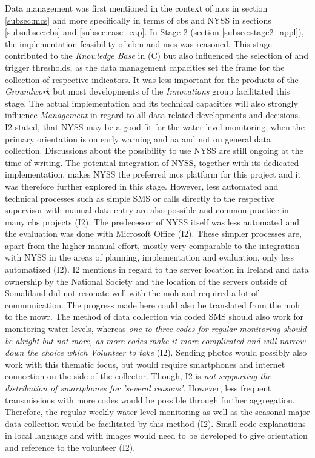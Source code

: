 Data management was first mentioned in the context of \acrlong{mcs} in section \ref*{subsec:mcs} and more specifically in terms of \acrlong{cbs} and NYSS in sections \ref*{subsubsec:cbs} and \ref*{subsec:case_eap}. In Stage 2 (section \ref*{subsec:stage2_appl}), the implementation feasibility of \acrshort{cbm} and \acrshort{mcs} was reasoned.\newline
This stage contributed to the \textit{Knowledge Base} in (C) but also influenced the selection of  and trigger thresholds, as the data management capacities set the frame for the collection of respective indicators. It was less important for the products of the \textit{Groundwork} but most developments of the \textit{Innovations} group facilitated this stage. The actual implementation and its technical capacities will also strongly influence \textit{Management} in regard to all data related developments and decisions.\newline
I2 stated, that NYSS may be a good fit for the water level monitoring, when the primary orientation is on early warning and \acrlong{aa} and not on general data collection. Discussions about the possibility to use NYSS are still ongoing at the time of writing. The potential integration of NYSS, together with its dedicated implementation, makes NYSS the preferred \acrshort{mcs} platform for this project and it was therefore further explored in this stage. However, less automated and technical processes such as simple SMS or calls directly to the respective supervisor with manual data entry are also possible and common practice in many \acrshort{cbs} projects (I2). The predecessor of NYSS itself was less automated and the evaluation was done with Microsoft Office (I2). These simpler processes are, apart from the higher manual effort, mostly very comparable to the integration with NYSS in the areas of planning, implementation and evaluation, only less automatized (I2).\newline
I2 mentions in regard to the server location in Ireland and data ownership by the National Society and the location of the servers outside of Somaliland did not resonate well with the \acrshort{moh} and required a lot of communication. The progress made here could also be translated from the \acrshort{moh} to the \acrshort{mowr}.\newline
The method of data collection via coded SMS should also work for monitoring water levels, whereas \textit{one to three codes for regular monitoring should be alright but not more, as more codes make it more complicated and will narrow down the choice which Volunteer to take} (I2). Sending photos would possibly also work with this thematic focus, but would require smartphones and internet connection on the side of the collector. Though, I2 is \textit{not supporting the distribution of smartphones for 'several reasons'}. However, less frequent transmissions with more codes would be possible through further aggregation. Therefore, the regular weekly water level monitoring as well as the seasonal major data collection would be facilitated by this method (I2). Small code explanations in local language and with images would need to be developed to give orientation and reference to the volunteer (I2).\newline
